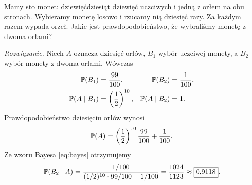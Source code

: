 \begin{przyklad}
\label{przykl:moneta}
Mamy sto monet: dziewięćdziesiąt dziewięć uczciwych i jedną
z orłem na obu stronach. Wybieramy monetę losowo i rzucamy nią dziesięć razy.
Za każdym razem wypada orzeł. Jakie jest prawdopodobieństwo,
że wybraliśmy monetę z dwoma orłami?
\end{przyklad}

\noindent\emph{Rozwiązanie.}
Niech $A$ oznacza dziesięć orłów, $B_1$ wybór uczciwej monety,
a $B_2$ wybór monety z dwoma orłami. Wówczas
\begin{align*}
  \mathbb{P}(B_1)&=\frac{99}{100},&
  \mathbb{P}(B_2)&=\frac1{100},\\
  \mathbb{P}(A\mid B_1)&=\left(\frac12\right)^{10},&
  \mathbb{P}(A\mid B_2)&=1.
\end{align*}
Prawdopodobieństwo dziesięciu orłów wynosi
\[
  \mathbb{P}(A)=\left(\frac12\right)^{10}\frac{99}{100}+\frac1{100}.
\]
Ze wzoru Bayesa \eqref{eq:bayes} otrzymujemy
\begin{equation}
  \mathbb{P}(B_2\mid A)
    =\frac{1/100}{(1/2)^{10}\cdot99/100+1/100}
    =\frac{1024}{1123}\approx\boxed{0{,}9118}.
  \label{eq:moneta-wynik}
\end{equation}
